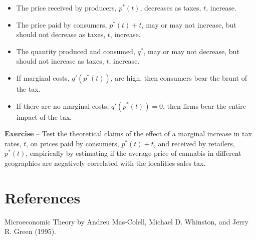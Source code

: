 \documentclass[11pt]{article}
\begin{document}
\begin{itemize}

\item The price received by producers, $p^*(t)$, decreases as taxes, $t$, increase.

\item The price paid by consumers, $p^*(t) + t$, may or may not increase, but should not decrease as taxes, $t$, increase.

\item The quantity produced and consumed, $q^*$, may or may not decrease, but should not increase as taxes, $t$, increase.

\item If marginal costs, $q'(p^*(t))$, are high, then consumers bear the brunt of the tax.

\item If there are no marginal costs, $q'(p^*(t)) = 0$, then firms bear the entire impact of the tax.

\end{itemize}


\vspace{\baselineskip}
{\bfseries Exercise} -- Test the theoretical claims of the effect of a marginal increase in tax rates, $t$, on prices paid by consumers, $p^*(t) + t$, and received by retailers, $p^*(t)$, empirically by estimating if the average price of cannabis in different geographies are negatively correlated with the localities sales tax.




\vspace{\baselineskip}
\section*{References}

Microeconomic Theory by Andreu Mas-Colell, Michael D. Whinston, and Jerry R. Green (1995).


\end{document}
